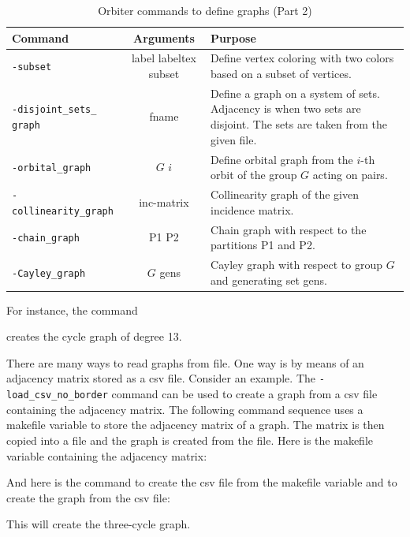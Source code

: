 \begin{table}
\begin{center}
\begin{tabular}{|p{4cm}|c|p{7cm}|}
\hline
Command & Arguments & Purpose \\
\hline
\hline
\verb'-subset' & label  labeltex subset  & Define vertex coloring with two colors based on a subset of vertices. \\
\hline
\verb'-disjoint_sets_' \verb'graph' & fname  & Define a graph on a system of sets. Adjacency is when two sets are disjoint. The sets are taken from the given file. \\
\hline
\verb'-orbital_graph' & $G$ $i$    & Define orbital graph from 
the $i$-th orbit of the group $G$ acting on pairs.  \\
\hline
\verb'-collinearity_graph' & inc-matrix   & Collinearity graph of the given incidence matrix.\\
\hline
\verb'-chain_graph' & P1 P2   & Chain graph with respect to the partitions P1 and P2.\\
\hline
\verb'-Cayley_graph' & $G$ gens   & Cayley graph with respect to group $G$ and generating set gens.\\
\hline
\end{tabular}
\end{center}
\caption{\label{tab:graphtypes:two}Orbiter commands to define graphs (Part 2)}
\end{table}



\bigskip

For instance, the command 
{\tt

}
creates the cycle graph of degree 13. 

\bigskip 

There are many ways to read graphs from file. 
One way is by means of an adjacency matrix stored as 
a csv file. 
Consider an example. 
The \verb'-load_csv_no_border' command can be used to create a graph 
from a csv file containing the adjacency matrix. 
The following command sequence uses a makefile variable to store the adjacency matrix of a graph. 
The matrix is then copied into a file and the graph is created from the file. 
Here is the makefile variable containing the adjacency matrix:
{\tt

}
And here is the command to create the csv file from the makefile variable and to create the graph from the csv file:
{\tt

}
This will create the three-cycle graph. 



